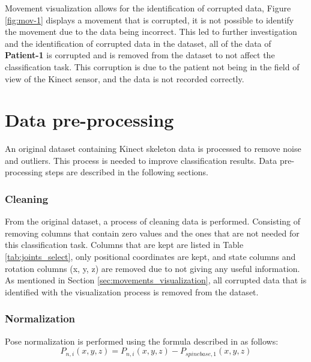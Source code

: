         Movement visualization allows for the identification of corrupted data, Figure \ref{fig:mov-1} displays a movement that is corrupted, it is not possible to identify the movement due to the data being incorrect. This led to further investigation and the identification of corrupted data in the dataset, all of the data of \textbf{Patient-1} is corrupted and is removed from the dataset to not affect the classification task. This corruption is due to the patient not being in the field of view of the Kinect sensor, and the data is not recorded correctly.
        
    \section{Data pre-processing}

        An original dataset containing Kinect skeleton data is processed to remove noise and outliers. This process is needed to improve classification results. Data pre-processing steps are described in the following sections.
        
        \subsubsection{Cleaning}
        
        From the original dataset, a process of cleaning data is performed. Consisting of removing columns that contain zero values and the ones that are not needed for this classification task. Columns that are kept are listed in Table \ref{tab:joints_select}, only positional coordinates are kept, and state columns and rotation columns (x, y, z) are removed due to not giving any useful information. As mentioned in Section \ref{sec:movements_visualization},  all corrupted data that is identified with the visualization process is removed from the dataset.

        \subsubsection{Normalization}

        Pose normalization is performed using the formula described in \cite{maudsley-barton_comparative_2017} as follows:
        \begin{equation}
            P_{n,i}(x,y,z) = P_{n,i}(x,y,z)-P_{spinebase,1}(x,y,z)
            \label{eq:pose_normalization}
        \end{equation}

